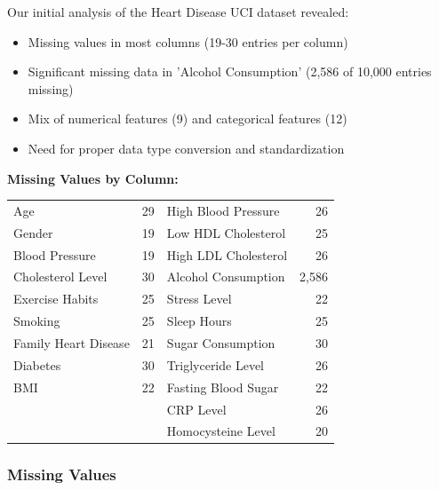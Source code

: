 \documentclass[11pt,a4paper]{article}
\begin{document}
\begin{tcolorbox}[
        title=Data Quality Issues Overview,
        colback=lightpurple!30,
        colframe=mediumpurple,
        boxrule=0.5pt,
        fonttitle=\bfseries\sffamily\footnotesize,
        fontupper=\footnotesize
    ]
    Our initial analysis of the Heart Disease UCI dataset revealed:
    \begin{itemize}[leftmargin=*, itemsep=2pt, parsep=0pt]
        \item Missing values in most columns (19-30 entries per column)
        \item Significant missing data in 'Alcohol Consumption' (2,586 of 10,000 entries missing)
        \item Mix of numerical features (9) and categorical features (12)
        \item Need for proper data type conversion and standardization
    \end{itemize}

    \textbf{Missing Values by Column:}

    \begin{tabular}{lr|lr}
        Age                  & 29 & High Blood Pressure  & 26    \\
        Gender               & 19 & Low HDL Cholesterol  & 25    \\
        Blood Pressure       & 19 & High LDL Cholesterol & 26    \\
        Cholesterol Level    & 30 & Alcohol Consumption  & 2,586 \\
        Exercise Habits      & 25 & Stress Level         & 22    \\
        Smoking              & 25 & Sleep Hours          & 25    \\
        Family Heart Disease & 21 & Sugar Consumption    & 30    \\
        Diabetes             & 30 & Triglyceride Level   & 26    \\
        BMI                  & 22 & Fasting Blood Sugar  & 22    \\
                             &    & CRP Level            & 26    \\
                             &    & Homocysteine Level   & 20    \\
    \end{tabular}
\end{tcolorbox}

\subsubsection{Missing Values}
\vspace{-0.25cm}
\end{document}
